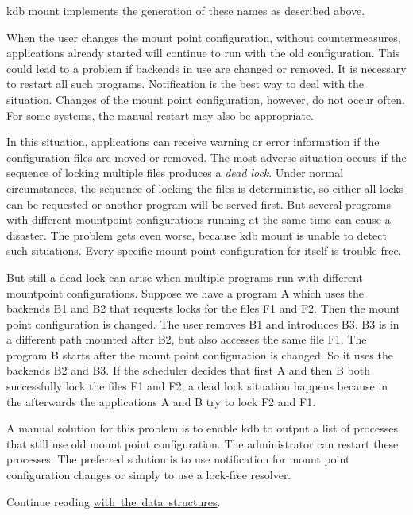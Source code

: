 {\ttfamily kdb mount} implements the generation of these names as described above.

When the user changes the mount point configuration, without countermeasures, applications already started will continue to run with the old configuration. This could lead to a problem if backends in use are changed or removed. It is necessary to restart all such programs. Notification is the best way to deal with the situation. Changes of the mount point configuration, however, do not occur often. For some systems, the manual restart may also be appropriate.

In this situation, applications can receive warning or error information if the configuration files are moved or removed. The most adverse situation occurs if the sequence of locking multiple files produces a {\itshape dead lock}. Under normal circumstances, the sequence of locking the files is deterministic, so either all locks can be requested or another program will be served first. But several programs with different mountpoint configurations running at the same time can cause a disaster. The problem gets even worse, because {\ttfamily kdb mount} is unable to detect such situations. Every specific mount point configuration for itself is trouble-\/free.

But still a dead lock can arise when multiple programs run with different mountpoint configurations. Suppose we have a program {\ttfamily A} which uses the backends {\ttfamily B1} and {\ttfamily B2} that requests locks for the files {\ttfamily F1} and {\ttfamily F2}. Then the mount point configuration is changed. The user removes {\ttfamily B1} and introduces {\ttfamily B3}. {\ttfamily B3} is in a different path mounted after {\ttfamily B2}, but also accesses the same file {\ttfamily F1}. The program {\ttfamily B} starts after the mount point configuration is changed. So it uses the backends {\ttfamily B2} and {\ttfamily B3}. If the scheduler decides that first {\ttfamily A} and then {\ttfamily B} both successfully lock the files {\ttfamily F1} and {\ttfamily F2}, a dead lock situation happens because in the afterwards the applications {\ttfamily A} and {\ttfamily B} try to lock {\ttfamily F2} and {\ttfamily F1}.

A manual solution for this problem is to enable {\ttfamily kdb} to output a list of processes that still use old mount point configuration. The administrator can restart these processes. The preferred solution is to use notification for mount point configuration changes or simply to use a lock-\/free resolver.

Continue reading \mbox{\hyperlink{doc_dev_data-structures_md}{with the data structures}}. 